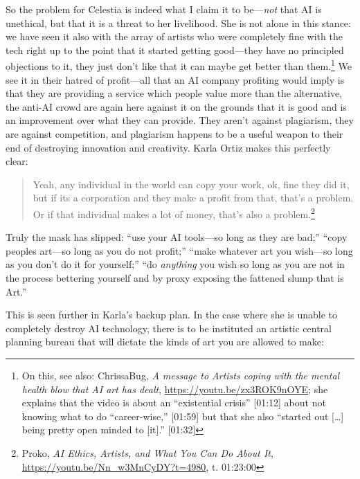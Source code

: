 \documentclass[11pt]{article}
\begin{document}
So the problem for Celestia is indeed what I claim it to be---\emph{not} that AI is unethical, but that it is a threat to her livelihood. She is not alone in this stance: we have seen it also with the array of artists who were completely fine with the tech right up to the point that it started getting good---they have no principled objections to it, they just don't like that it can maybe get better than them.\footnote{On this, see also: ChrissaBug, \emph{A message to Artists coping with the mental health blow that AI art has dealt}, \url{https://youtu.be/zx3ROK9nOYE}; she explains that the video is about an ``existential crisis'' [01:12] about not knowing what to do ``career-wise,'' [01:59] but that she also ``started out [\ldots{}] being pretty open minded to [it].'' [01:32]} We see it in their hatred of profit---all that an AI company profiting would imply is that they are providing a service which people value more than the alternative, the anti-AI crowd are again here against it on the grounds that it is good and is an improvement over what they can provide. They aren't against plagiarism, they are against competition, and plagiarism happens to be a useful weapon to their end of destroying innovation and creativity. Karla Ortiz makes this perfectly clear:

\begin{quote}
Yeah, any individual in the world can copy your work, ok, fine they did it, but if its a corporation and they make a profit from that, that's a problem. Or if that individual makes a lot of money, that's also a problem.\footnote{Proko, \emph{AI Ethics, Artists, and What You Can Do About It}, \url{https://youtu.be/Nn\_w3MnCyDY?t=4980}, t. 01:23:00}
\end{quote}

Truly the mask has slipped: ``use your AI tools---so long as they are bad;'' ``copy peoples art---so long as you do not profit;'' ``make whatever art you wish---so long as you don't do it for yourself;'' ``do \emph{anything} you wish so long as you are not in the process bettering yourself and by proxy exposing the fattened slump that is Art.''

This is seen further in Karla's backup plan. In the case where she is unable to completely destroy AI technology, there is to be instituted an artistic central planning bureau that will dictate the kinds of art you are allowed to make:
\end{document}
